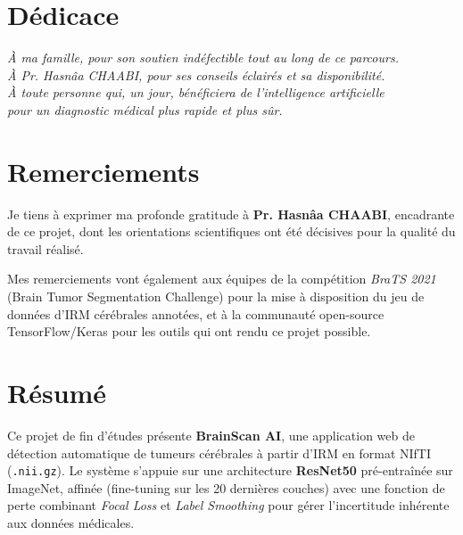 \documentclass[12pt, a4paper]{report}
\newcommand{\code}[1]{\texttt{\small #1}}
\begin{document}
\chapter*{Dédicace}
\thispagestyle{empty}

\begin{center}
  \itshape\large
  À ma famille, pour son soutien indéfectible tout au long de ce parcours.\\[0.5cm]
  À Pr. Hasnâa CHAABI, pour ses conseils éclairés et sa disponibilité.\\[0.5cm]
  À toute personne qui, un jour, bénéficiera de l'intelligence artificielle\\
  pour un diagnostic médical plus rapide et plus sûr.
\end{center}

\chapter*{Remerciements}

Je tiens à exprimer ma profonde gratitude à \textbf{Pr. Hasnâa CHAABI},
encadrante de ce projet, dont les orientations scientifiques ont été
décisives pour la qualité du travail réalisé.

Mes remerciements vont également aux équipes de la compétition
\textit{BraTS 2021} (Brain Tumor Segmentation Challenge) pour la mise
à disposition du jeu de données d'IRM cérébrales annotées, et à la
communauté open-source TensorFlow/Keras pour les outils qui ont rendu
ce projet possible.

\chapter*{Résumé}

Ce projet de fin d'études présente \textbf{BrainScan AI}, une application
web de détection automatique de tumeurs cérébrales à partir d'IRM en
format NIfTI (\code{.nii.gz}). Le système s'appuie sur une architecture
\textbf{ResNet50} pré-entraînée sur ImageNet, affinée (fine-tuning sur
les 20 dernières couches) avec une fonction de perte combinant
\textit{Focal Loss} et \textit{Label Smoothing} pour gérer
l'incertitude inhérente aux données médicales.
\end{document}
